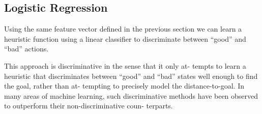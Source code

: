 \subsection{Logistic Regression}
Using the same feature vector defined in the previous section we can learn a heuristic function using a linear classifier to discriminate between “good” and “bad” actions.

This approach is discriminative in the sense that it only at-
tempts to learn a heuristic that discriminates between “good”
and “bad” states well enough to find the goal, rather than at-
tempting  to  precisely  model  the  distance-to-goal.   In  many
areas of machine learning, such discriminative methods have
been observed to outperform their non-discriminative coun-
terparts. 